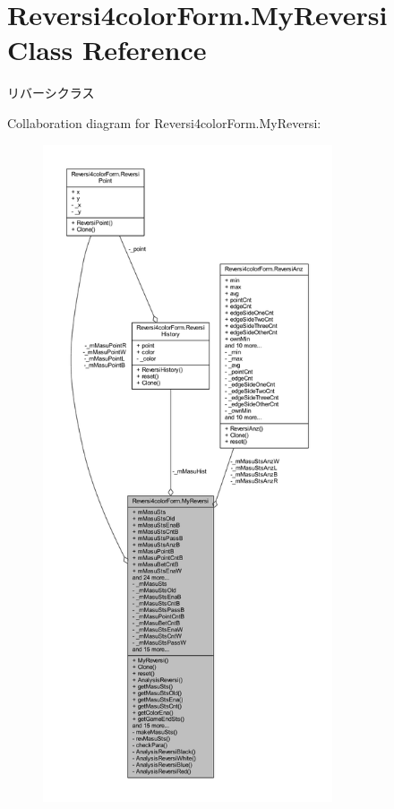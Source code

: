 \hypertarget{class_reversi4color_form_1_1_my_reversi}{}\section{Reversi4color\+Form.\+My\+Reversi Class Reference}
\label{class_reversi4color_form_1_1_my_reversi}


リバーシクラス  




Collaboration diagram for Reversi4color\+Form.\+My\+Reversi\+:
\nopagebreak
\begin{figure}[H]
\begin{center}
\leavevmode
\includegraphics[height=550pt]{class_reversi4color_form_1_1_my_reversi__coll__graph}
\end{center}
\end{figure}

